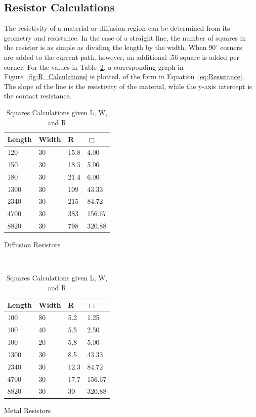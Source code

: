 \documentclass[letter,12pt]{article}
\begin{document}
	\FloatBarrier
	\subsection{Resistor Calculations}	
		The resistivity of a material or diffusion region can be determined from its geometry and resistance. In the case of a straight line, the number of squares in the resistor is as simple as dividing the length by the width.  When 90$^\circ$ corners are added to the current path, however, an additional .56 square is added per corner. For the values in Table~\ref{tab:R_Calculations}, a corresponding graph in Figure~\ref{fig:R_Calculations} is plotted, of the form in Equation~\ref{eq:Resistance}.  The slope of the line is the resistivity of the material, while the y-axis intercept is the contact resistance.
		
		\begin{table}[]
			\centering
			\begin{subtable}[b]{.45\textwidth}
				\begin{tabular}{l | l | l | l}
					Length & Width & R & $\Box$ \\
					\hline
					120 & 30 & 15.8 & 4.00 \\
					150 & 30 & 18.5 & 5.00 \\
					180 & 30 & 21.4 & 6.00 \\
					1300 & 30 & 109 & 43.33 \\
					2340 & 30 & 215 & 84.72 \\
					4700 & 30 & 383 & 156.67 \\
					8820 & 30 & 798 & 320.88 \\
				\end{tabular}
				\caption{Diffusion Resistors}
				\label{tab:R_Diffusion_Calculations}
			\end{subtable}
			~
			\begin{subtable}[b]{.45\textwidth}
				\begin{tabular}{l | l | l | l}
					Length & Width & R & $\Box$ \\
					\hline
					100 & 80 & 5.2 & 1.25 \\
					100 & 40 & 5.5 & 2.50 \\
					100 & 20 & 5.8 & 5.00 \\
					1300 & 30 & 8.5 & 43.33 \\
					2340 & 30 & 12.3 & 84.72 \\
					4700 & 30 & 17.7 & 156.67 \\
					8820 & 30 & 30 & 320.88 \\
				\end{tabular}
				\caption{Metal Resistors}
				\label{tab:R_Metal_Calculations}
			\end{subtable}
			\caption{Squares Calculations given L, W, and R}
			\label{tab:R_Calculations}
		\end{table}
	
\end{document}

